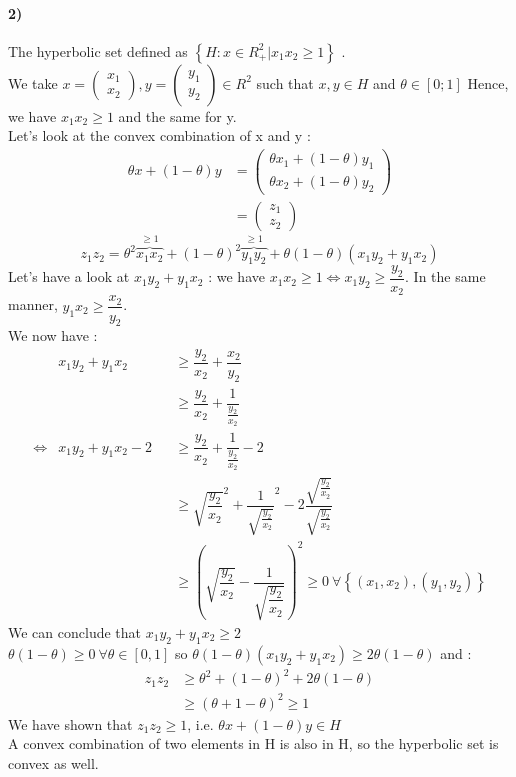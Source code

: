 \documentclass[12pt,a4paper]{article}
\begin{document}
\paragraph{2)} The hyperbolic set defined as $\left\lbrace H :  x \in R^2_+ | x_1x_2 \geq 1\right\rbrace$ .\\
We take $ x = \begin{pmatrix}
	x_1 \\ x_2  
\end{pmatrix},y = \begin{pmatrix}
	y_1\\y_2 
\end{pmatrix}\in R^2 $ such that $ x,y \in H $ and $ \theta \in [0;1] $
Hence, we have $ x_1 x_2 \geq 1 $ and the same for y.\\
Let's look at the convex combination of x and y : 
\begin{align*}
	\theta x + (1-\theta) y & = \begin{pmatrix}
		\theta x_1 + (1-\theta) y_1 \\
		\theta x_2 + (1-\theta) y_2
	\end{pmatrix} \\
				& = \begin{pmatrix}
					z_1 \\ z_2 
				\end{pmatrix}
\end{align*}
\[
	z_1 z_2 = \theta^2 \overbrace{x_1x_2}^{\geq 1}+ (1-\theta)^2 \overbrace{y_1y_2}^{\geq 1} + \theta (1-\theta) (x_1y_2+y_1x_2)
\]\newline
Let's have a look at $ x_1y_2 + y_1x_2 $ : we have $ x_1 x_2 \geq 1 \Leftrightarrow x_1 y_2 \geq \dfrac{y_2}{x_2} $. In the same manner, $ y_1 x_2 \geq \dfrac{x_2}{y_2} $.\\
We now have : \begin{align*}
	& x_1 y_2 + y_1 x_2 && \geq \dfrac{y_2}{x_2} + \dfrac{x_2}{y_2} \\
	& && \geq \dfrac{y_2}{x_2} + \dfrac{1}{\frac{y_2}{x_2}}\\
	\Leftrightarrow & x_1y_2 + y_1x_2 -2 &&\geq  \dfrac{y_2}{x_2} + \dfrac{1}{\frac{y_2}{x_2}}-2\\
			& && \geq \sqrt{\dfrac{y_2}{x_2}}^2+\dfrac{1}{\sqrt{\frac{y_2}{x_2}}}^2
		-2 \dfrac{\sqrt{\frac{y_2}{x_2}}}{\sqrt{\frac{y_2}{x_2}}}\\
			& && \geq \left( \sqrt{\dfrac{y_2}{x_2}}-\dfrac{1}{\sqrt{\dfrac{y_2}{x_2}}}\right)^2\geq 0 ~\forall \left\lbrace (x_1,x_2), (y_1,y_2)\right\rbrace
\end{align*}
We can conclude that $ x_1 y_2 + y_1 x_2 \geq 2 $\\
$ \theta (1-\theta)\geq 0 ~\forall \theta \in [0,1] $ so $ \theta (1-\theta) (x_1y_2+y_1x_2) \geq 2\theta (1-\theta) $ and : \begin{align*}
	z_1z_2 &\geq \theta ^2 + (1-\theta)^2 + 2\theta(1-\theta) \\
	       &\geq (\theta + 1 - \theta)^2 \geq 1
\end{align*}
We have shown that $ z_1z_2 \geq 1 $, i.e. $ \theta x + (1-\theta)y \in H $\\
A convex combination of two elements in H is also in H, so the hyperbolic set is convex as well.
\end{document}

